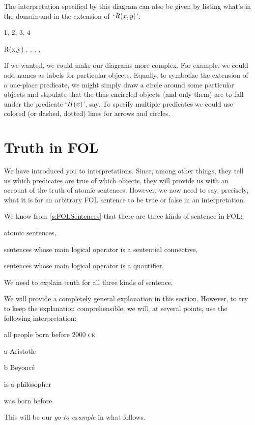 The interpretation specified by this diagram can also be given by listing what's in the domain and in the extension of~`$\mathord{R}(x,y)$':
	\begin{ekey}
	\item[\text{domain}] $1$, $2$, $3$, $4$
	\item[R(x,y)] , 
		, 
		, 
		,
	\end{ekey}
If we wanted, we could make our diagrams more complex. For example, we could add names as labels for particular objects. Equally, to symbolize the extension of a one-place predicate, we might simply draw a circle around some particular objects and stipulate that the thus encircled objects (and only them) are to fall under the predicate `$\mathord{H}(x)$', say. To specify multiple predicates we could use colored (or dashed, dotted) lines for arrows and circles.


\chapter{Truth in FOL}\label{s:TruthFOL}
We have introduced you to interpretations. Since, among other things, they tell us which predicates are true of which objects, they will provide us with an account of the truth of atomic sentences. However, we now need to say, precisely, what it is for an arbitrary FOL sentence to be true or false in an interpretation.

We know from \cref{s:FOLSentences} that there are three kinds of sentence in FOL: 
	\begin{compactlist}
		\item atomic sentences,
		\item sentences whose main logical operator is a sentential connective,
		\item sentences whose main logical operator is a quantifier.
	\end{compactlist}
We need to explain truth for all three kinds of sentence.

We will provide a completely general explanation in this section. However, to try to keep the explanation comprehensible, we will, at several points, use the following interpretation:
	\begin{ekey}
		\item[\text{domain}] all people born before 2000 \textsc{ce}
		\item[a] Aristotle
		\item[b] Beyonc\'e
		\item[\atom{P}{x}]  is a philosopher
		\item[\atom{R}{x,y}]  was born before \gap{y}
	\end{ekey}
This will be our \emph{go-to example} in what follows.

